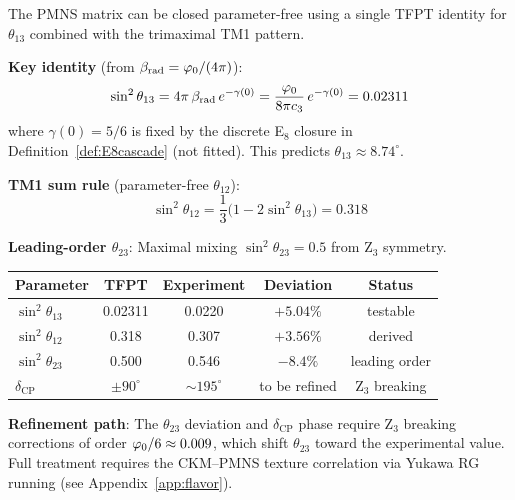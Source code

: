 \begin{tcolorbox}[colback=blue!3, colframe=blue!50!black, 
    title={\textbf{PMNS Closure via $\beta_{\text{rad}}$ Identities}}, fonttitle=\bfseries]
The PMNS matrix can be closed parameter-free using a single TFPT identity for $\theta_{13}$
combined with the trimaximal TM1 pattern.

\textbf{Key identity} (from $\beta_{\text{rad}} = \varphi_0/(4\pi)$):
\begin{equation}
    \sin^2\theta_{13} = 4\pi\,\beta_{\text{rad}}\, e^{-\gamma(0)} 
    = \frac{\varphi_0}{8\pi c_3}\, e^{-\gamma(0)} = 0.02311
\end{equation}
where $\gamma(0)=5/6$ is fixed by the discrete E$_8$ closure in Definition~\ref{def:E8cascade} (not fitted). 
This predicts $\theta_{13} \approx 8.74^\circ$.

\textbf{TM1 sum rule} (parameter-free $\theta_{12}$):
\begin{equation}
    \sin^2\theta_{12} = \frac{1}{3}\bigl(1 - 2\sin^2\theta_{13}\bigr) = 0.318
\end{equation}

\textbf{Leading-order $\theta_{23}$}: Maximal mixing $\sin^2\theta_{23} = 0.5$ from Z$_3$ symmetry.

\begin{center}
\begin{tabular}{@{}lcccc@{}}
\toprule
\textbf{Parameter} & \textbf{TFPT} & \textbf{Experiment} & \textbf{Deviation} & \textbf{Status}\\
\midrule
$\sin^2\theta_{13}$ & 0.02311 & 0.0220 & $+5.04\%$ & testable\\
$\sin^2\theta_{12}$ & 0.318 & 0.307 & $+3.56\%$ & derived\\
$\sin^2\theta_{23}$ & 0.500 & 0.546 & $-8.4\%$ & leading order\\
$\delta_{\text{CP}}$ & $\pm 90^\circ$ & $\sim 195^\circ$ & to be refined & Z$_3$ breaking\\
\bottomrule
\end{tabular}
\end{center}

\textbf{Refinement path}: The $\theta_{23}$ deviation and $\delta_{\text{CP}}$ phase require 
Z$_3$ breaking corrections of order $\varphi_0/6 \approx 0.009$, which shift $\theta_{23}$ toward 
the experimental value. Full treatment requires the CKM--PMNS texture correlation via 
Yukawa RG running (see Appendix~\ref{app:flavor}).
\end{tcolorbox}

